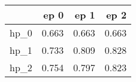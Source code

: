 \begin{tabular}{lrrr}
\toprule
{} &   ep 0 &   ep 1 &   ep 2 \\
\midrule
hp\_0 &  0.663 &  0.663 &  0.663 \\
hp\_1 &  0.733 &  0.809 &  0.828 \\
hp\_2 &  0.754 &  0.797 &  0.823 \\
\bottomrule
\end{tabular}
